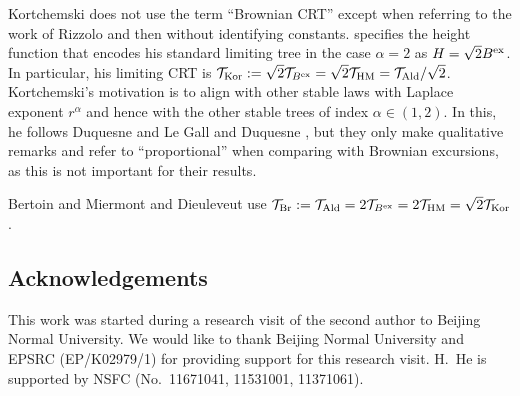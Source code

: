 \documentclass[11pt,a4paper]{article}
\newcommand{\cT}{\mathcal{T}}
\newcommand{\lambdaLaplace}{r}
\begin{document}
\begin{appendix}
Kortchemski \cite{Kor12} does not use the term ``Brownian CRT'' except when referring to the work of Rizzolo \cite{Riz13} and then without identifying
constants. \cite[Remark 4.6]{Kor12} specifies the height function that encodes his standard limiting tree in the case $\alpha=2$ as $H=\sqrt{2}B^{\rm ex}$. In particular, his
limiting CRT is $\cT_{\rm Kor}:=\sqrt{2}\cT_{B^{\rm ex}}=\sqrt{2}\cT_{\rm HM}=\cT_{\rm Ald}/\sqrt{2}$. Kortchemski's motivation is to align with other stable laws with Laplace
exponent $\lambdaLaplace^\alpha$ and hence with the other stable trees of index $\alpha\in(1,2)$. In this, he follows Duquesne and Le Gall \cite[p.105]{DuLG} and Duquesne
\cite[p.1002]{Duq03}, but they only make qualitative remarks and refer to ``proportional'' when comparing with Brownian excursions, as this is not important for
their results.

Bertoin and Miermont \cite{BM} and Dieuleveut \cite{Die13} use $\cT_{\rm Br}:=\cT_{\rm Ald}=2\cT_{B^{\rm ex}}=2\cT_{\rm HM}=\sqrt{2}\cT_{\rm Kor}$.

\end{appendix}

\subsection*{Acknowledgements}\vspace{-0.2cm}

This work was started during a research visit of the second author to Beijing Normal University. We would like to thank Beijing Normal University and EPSRC (EP/K02979/1) for providing support for this research visit. H.\ He is supported by  NSFC (No.\ 11671041, 11531001, 11371061).
	



\end{document}
